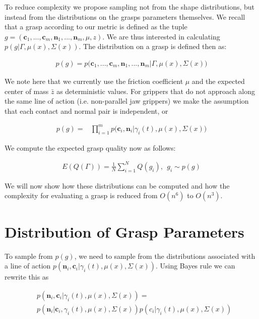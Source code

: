\documentclass[letterpaper, 10 pt, conference]{ieeeconf}  %
\begin{document}
To reduce complexity we propose sampling not from the shape distributions, but instead from the distributions on the grasps parameters themselves. We recall that a grasp according to our metric is defined as the tuple $g = ( \textbf{c}_1,...,\textbf{c}_m,\textbf{n}_1,...,\textbf{n}_m,\mu, z )$. We are thus interested in calculating $p(g|\Gamma,\mu(x),\Sigma(x))$. The distribution on a grasp is defined then as: 

\begin{align}\label{eq:joint_on_shape}
p(g) = p\big(\textbf{c}_1,...,\textbf{c}_m,\textbf{n}_1,...,\textbf{n}_m|\Gamma,\mu(x),\Sigma(x)\big)
\end{align}

We note here that we currently use the friction coefficient $\mu$ and the expected center of mass $\bar{z}$ as deterministic values. For grippers that do not approach along the same line of action (i.e. non-parallel jaw grippers) we make the assumption that each contact and normal pair is independent, or 

\vspace{-2ex}
\begin{align}\label{eq:independence}
p(g) = &\prod_{i=1}^mp\big(\textbf{c}_i,\textbf{n}_i|\gamma_i(t),\mu(x),\Sigma(x)\big)
\end{align}

We compute the expected grasp quality now as follows: 

\vspace{-2ex}
\begin{align}\label{eq:grasp_sampling}
E(Q(\Gamma)) = \frac{1}{N} \sum_{i=1}^N Q(g_i) , \ \ g_i \sim p(g)
\end{align}

We will now show how these distributions can be computed and how the complexity for evaluating a grasp is reduced from $O(n^6)$ to $O(n^3)$. 

\section{Distribution of Grasp Parameters}
\label{sec:distgrasp}
 
 To sample from $p(g)$, we need to sample from the distributions associated with a line of action $p(\textbf{n}_i,\textbf{c}_i|\gamma_i(t),\mu(x),\Sigma(x))$. Using Bayes rule we can rewrite this as 
 
 \vspace{-2ex}
 \begin{align*}
 &p(\textbf{n}_i,\textbf{c}_i|\gamma_i(t),\mu(x),\Sigma(x))=\\
 &p(\textbf{n}_i|\textbf{c}_i,\gamma_i(t),\mu(x),\Sigma(x))p(c_i|\gamma_i(t),\mu(x),\Sigma(x))
 \end{align*}
 
\end{document}
